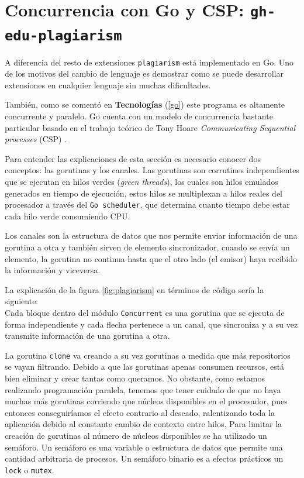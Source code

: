 \section{Concurrencia con Go y CSP: {\tt gh-edu-plagiarism}} \label{diseño:gh-edu-plagiarism}
A diferencia del resto de extensiones \verb|plagiarism| está implementado en Go. Uno de los motivos del cambio de lenguaje es demostrar como se puede desarrollar extensiones en cualquier lenguaje sin muchas dificultades.

También, como se comentó en \textbf{Tecnologías} (\ref{go}) este programa es altamente concurrente y paralelo. Go cuenta con un modelo de concurrencia bastante particular basado en el trabajo teórico de Tony Hoare \emph{Communicating Sequential processes} (CSP) \cite{hoare1985communicating}.

Para entender las explicaciones de esta sección es necesario conocer dos conceptos: las gorutinas y los canales. Las gorutinas son \glspl{corrutine} independientes que se ejecutan en hilos verdes (\emph{green threads}), los cuales son hilos emulados generados en tiempo de ejecución, estos hilos se multiplexan a hilos reales del procesador a través del \verb|Go scheduler|, que determina cuanto tiempo debe estar cada hilo verde consumiendo CPU.

Los canales son la estructura de datos que nos permite enviar información de una gorutina a otra y también sirven de elemento sincronizador, cuando se envía un elemento, la gorutina no continua hasta que el otro lado (el emisor) haya recibido la información y viceversa.

La explicación de la figura \ref{fig:plagiarism} en términos de código sería la siguiente:\\
Cada bloque dentro del módulo \verb|Concurrent| es una gorutina que se ejecuta de forma independiente y cada flecha pertenece a un canal, que sincroniza y a su vez transmite información de una gorutina a otra.

La gorutina \verb|clone| va creando a su vez gorutinas a medida que más repositorios se vayan filtrando. Debido a que las gorutinas apenas consumen recursos, está bien eliminar y crear tantas como queramos. No obstante, como estamos realizando programación paralela, tenemos que tener cuidado de que no haya muchas más gorutinas corriendo que núcleos disponibles en el procesador, pues entonces conseguiríamos el efecto contrario al deseado, ralentizando toda la aplicación debido al constante cambio de contexto entre hilos. Para limitar la creación de gorutinas al número de núcleos disponibles se ha utilizado un semáforo. Un semáforo es una variable o estructura de datos que permite una cantidad arbitraria de procesos. Un semáforo binario es a efectos prácticos un \verb|lock| o \verb|mutex|.

